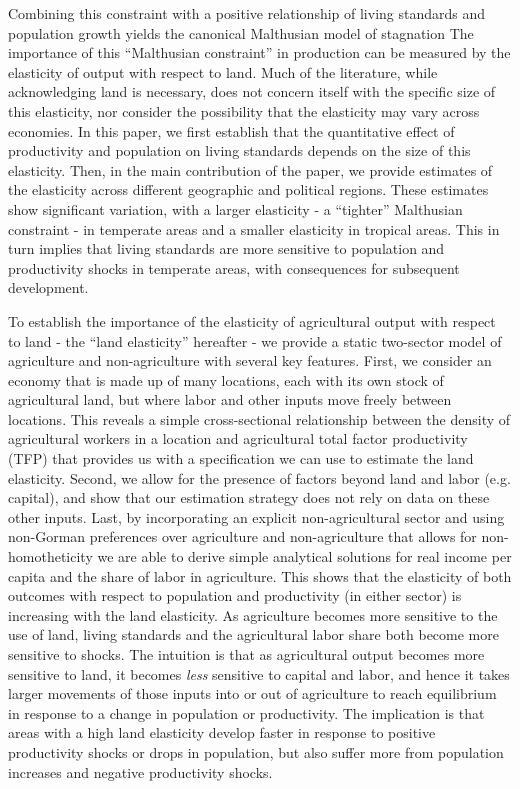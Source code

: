 Combining this constraint with a positive relationship of living standards and population growth yields the canonical Malthusian model of stagnation  The importance of this ``Malthusian constraint'' in production can be measured by the elasticity of output with respect to land. Much of the literature, while acknowledging land is necessary, does not concern itself with the specific size of this elasticity, nor consider the possibility that the elasticity may vary across economies. In this paper, we first establish that the quantitative effect of productivity and population on living standards depends on the size of this elasticity. Then, in the main contribution of the paper, we provide estimates of the elasticity across different geographic and political regions. These estimates show significant variation, with a larger elasticity - a ``tighter'' Malthusian constraint - in temperate areas and a smaller elasticity in tropical areas. This in turn implies that living standards are more sensitive to population and productivity shocks in temperate areas, with consequences for subsequent development. 

To establish the importance of the elasticity of agricultural output with respect to land - the ``land elasticity'' hereafter - we provide a static two-sector model of agriculture and non-agriculture with several key features. First, we consider an economy that is made up of many locations, each with its own stock of agricultural land, but where labor and other inputs move freely between locations. This reveals a simple cross-sectional relationship between the density of agricultural workers in a location and agricultural total factor productivity (TFP) that provides us with a specification we can use to estimate the land elasticity. Second, we allow for the presence of factors beyond land and labor (e.g. capital), and show that our estimation strategy does not rely on data on these other inputs. Last, by incorporating an explicit non-agricultural sector and using non-Gorman preferences over agriculture and non-agriculture that allows for non-homotheticity \citep{boppart2014} we are able to derive simple analytical solutions for real income per capita and the share of labor in agriculture. This shows that the elasticity of both outcomes with respect to population and productivity (in either sector) is increasing with the land elasticity. As agriculture becomes more sensitive to the use of land, living standards and the agricultural labor share both become more sensitive to shocks. The intuition is that as agricultural output becomes more sensitive to land, it becomes \textit{less} sensitive to capital and labor, and hence it takes larger movements of those inputs into or out of agriculture to reach equilibrium in response to a change in population or productivity. The implication is that areas with a high land elasticity develop faster in response to positive productivity shocks or drops in population, but also suffer more from population increases and negative productivity shocks.

